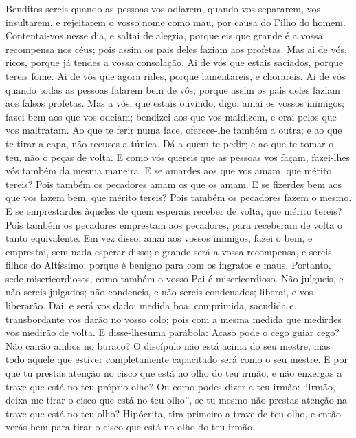 {  Benditos sereis quando as pessoas vos odiarem, quando vos separarem, vos insultarem, e rejeitarem o vosso nome como mau, por causa do Filho do homem.
  Contentai-vos nesse dia, e saltai de alegria, porque eis que grande é a vossa recompensa nos céus; pois assim os pais deles faziam aos profetas.
  Mas ai de vós, ricos, porque já tendes a vossa consolação.
  Ai de vós que estais saciados, porque tereis fome. Ai de vós que agora rides, porque lamentareis, e chorareis.
  Ai de vós quando todas as pessoas falarem bem de vós; porque assim os pais deles faziam aos falsos profetas.
  Mas a vós, que estais ouvindo, digo: amai os vossos inimigos; fazei bem aos que vos odeiam;
  bendizei aos que vos maldizem, e orai pelos que vos maltratam.
  Ao que te ferir numa face, oferece-lhe também a outra; e ao que te tirar a capa, não recuses a túnica.
  Dá a quem te pedir; e ao que te tomar o
{} teu, não o peças de volta.
  E como vós quereis que as pessoas vos façam, fazei-lhes vós também da mesma maneira.
  E se amardes aos que vos amam, que mérito tereis? Pois também os pecadores amam os que os amam.
  E se fizerdes bem aos que vos fazem bem, que mérito tereis? Pois também os pecadores fazem o mesmo.
  E se emprestardes àqueles de quem esperais receber de volta, que mérito tereis? Pois também os pecadores emprestam aos pecadores, para receberam de volta o tanto equivalente.
  Em vez disso, amai aos vossos inimigos, fazei o bem, e emprestai, sem nada esperar disso; e grande será a vossa recompensa, e sereis filhos do Altíssimo; porque é benigno
{} para com os ingratos e maus.
  Portanto, sede misericordiosos, como também o vosso Pai é misericordioso.
  Não julgueis, e não sereis julgados; não condeneis, e não sereis condenados; liberai, e vos liberarão.
  Dai, e será vos dado; medida boa, comprimida, sacudida e transbordante vos darão no vosso colo; pois com a mesma medida que medirdes vos medirão de volta.
  E disse-lhesuma parábola: Acaso pode o cego guiar
{} cego? Não cairão ambos no buraco?
  O discípulo não está acima do seu mestre; mas todo aquele que estiver completamente capacitado será como o seu mestre.
  E por que tu prestas atenção no cisco que está no olho do teu irmão, e não enxergas a trave que está no teu próprio olho?
  Ou como podes dizer a teu irmão: “Irmão, deixa-me tirar o cisco que está no teu olho”, se tu mesmo não prestas atenção na trave que está no teu olho? Hipócrita, tira primeiro a trave de teu olho, e então verás bem para tirar o cisco que está no olho do teu irmão.
}
